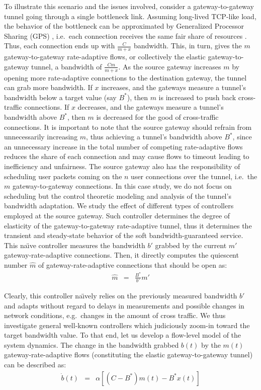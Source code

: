 \documentclass{article}
\begin{document}
To illustrate this scenario and  the issues involved,
  consider a gateway-to-gateway tunnel going through a single bottleneck
  link.  Assuming long-lived TCP-like load, the behavior of the bottleneck can be
  approximated by Generalized Processor Sharing (GPS) \cite{GPS:1994}, 
  i.e.\ each connection receives the same fair share of resources \cite{Chiu:1989}.
  Thus, each connection ends up with
  $\frac{C}{m+x}$ bandwidth.  This, in turn, gives the $m$ gateway-to-gateway rate-adaptive
  flows, or collectively the elastic gateway-to-gateway tunnel, a bandwidth of
  $\frac{Cm}{m+x}$.  As the source gateway increases $m$ by opening more
  rate-adaptive connections to the destination gateway, the tunnel can grab more
  bandwidth.  If $x$ increases, and the gateways measure a tunnel's
  bandwidth below a target value (say $B^*$), then $m$ is increased to
  push back cross-traffic connections.  If $x$ decreases, and the gateways
  measure a tunnel's bandwidth above $B^*$, then $m$ is decreased for
  the good of cross-traffic connections.  It is important to note that
  the source gateway should refrain from unnecessarily increasing $m$,
  thus achieving a tunnel's bandwidth above $B^*$, since an
  unnecessary increase in the total number of competing rate-adaptive flows
  reduces the share of each connection and may cause flows to
  timeout leading to inefficiency and unfairness.  
  The source gateway also has the responsibility
  of scheduling user packets coming on the $n$ user connections over
  the tunnel, i.e.\ the $m$ gateway-to-gateway connections.
  In this case study, we do not focus on scheduling but the control theoretic 
  modeling and analysis of the tunnel's bandwidth adaptation.
 We study the effect of different types of controllers employed at the source gateway.
 Such controller determines the degree of
elasticity of the gateway-to-gateway rate-adaptive tunnel,
thus it determines
the transient and steady-state behavior of
the soft bandwidth-guaranteed service. \\

This na\"{\i}ve controller 
measures the bandwidth $b'$ grabbed by 
the current $m'$ gateway-rate-adaptive connections.
Then,
it directly computes the quiescent number $\hat{m}$
of gateway-rate-adaptive  connections that should be open as:
\begin{eqnarray*} 
 \label{eqn:q_m} 
 \hat{m} &=& \frac{B^*}{b'}m'
\end{eqnarray*}

\noindent
Clearly, this controller na\"{\i}vely relies on
the previously measured bandwidth $b'$
and adapts without regard to delays in
measurements and possible changes in network conditions,
e.g.\ changes in the amount of cross traffic.
We thus investigate general well-known controllers
which judiciously zoom-in toward the target bandwidth value.
To that end,
let us develop a flow-level model
of the system dynamics. 
The change in
the bandwidth grabbed $b(t)$ by the $m(t)$ 
gateway-rate-adaptive flows (constituting the elastic gateway-to-gateway tunnel) 
can be described as:
\begin{eqnarray*} 
 \label{eqn:b_dot}    
   \dot b(t) &=&   \alpha [ (C-B^*) m(t) - B^* x(t)]
\end{eqnarray*}
\end{document}
